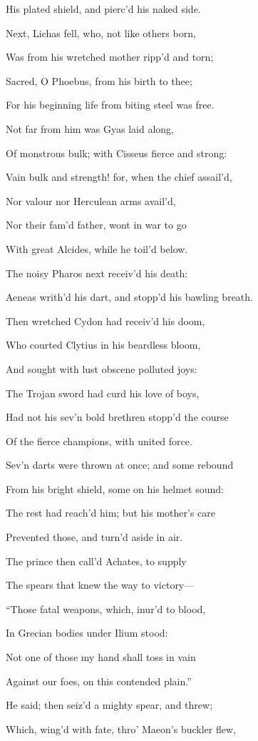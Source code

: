 His plated shield, and pierc’d his naked side.

Next, Lichas fell, who, not like others born,

Was from his wretched mother ripp’d and torn;

Sacred, O Phoebus, from his birth to thee;

For his beginning life from biting steel was free.

Not far from him was Gyas laid along,

Of monstrous bulk; with Cisseus fierce and strong:

Vain bulk and strength! for, when the chief assail’d,

Nor valour nor Herculean arms avail’d,

Nor their fam’d father, wont in war to go

With great Alcides, while he toil’d below.

The noisy Pharos next receiv’d his death:

Aeneas writh’d his dart, and stopp’d his bawling breath.

Then wretched Cydon had receiv’d his doom,

Who courted Clytius in his beardless bloom,

And sought with lust obscene polluted joys:

The Trojan sword had curd his love of boys,

Had not his sev’n bold brethren stopp’d the course

Of the fierce champions, with united force.

Sev’n darts were thrown at once; and some rebound

From his bright shield, some on his helmet sound:

The rest had reach’d him; but his mother’s care

Prevented those, and turn’d aside in air.

The prince then call’d Achates, to supply

The spears that knew the way to victory—

“Those fatal weapons, which, inur’d to blood,

In Grecian bodies under Ilium stood:

Not one of those my hand shall toss in vain

Against our foes, on this contended plain.”

He said; then seiz’d a mighty spear, and threw;

Which, wing’d with fate, thro’ Maeon’s buckler flew,

